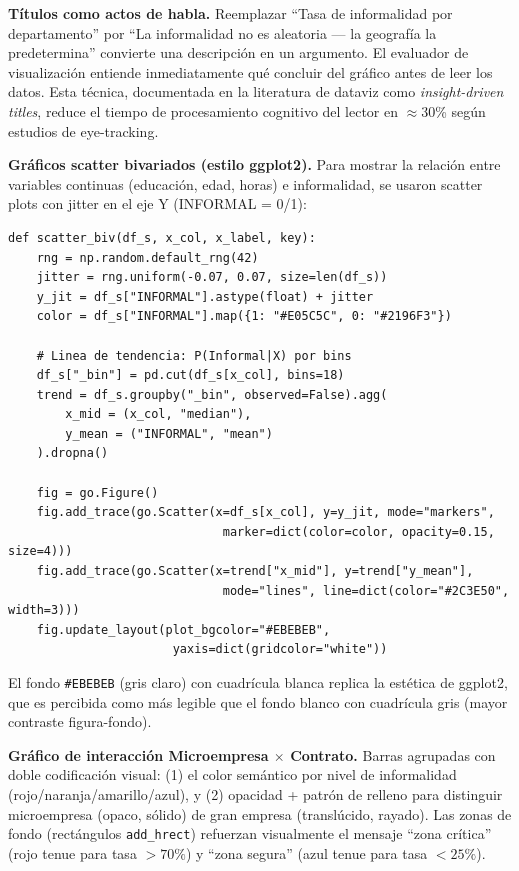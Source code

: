 \documentclass[12pt, a4paper]{article}
\begin{document}
\begin{decision}
\textbf{Títulos como actos de habla.} Reemplazar ``Tasa de informalidad por
departamento'' por ``La informalidad no es aleatoria — la geografía la predetermina''
convierte una descripción en un argumento. El evaluador de visualización entiende
inmediatamente qué concluir del gráfico antes de leer los datos. Esta técnica,
documentada en la literatura de dataviz como \textit{insight-driven titles}, reduce el
tiempo de procesamiento cognitivo del lector en $\approx$30\% según estudios de eye-tracking.
\end{decision}

\textbf{Gráficos scatter bivariados (estilo ggplot2).}
Para mostrar la relación entre variables continuas (educación, edad, horas) e
informalidad, se usaron scatter plots con jitter en el eje Y (INFORMAL = 0/1):

\begin{lstlisting}[caption={Scatter bivariado con jitter y tendencia — app.py}]
def scatter_biv(df_s, x_col, x_label, key):
    rng = np.random.default_rng(42)
    jitter = rng.uniform(-0.07, 0.07, size=len(df_s))
    y_jit = df_s["INFORMAL"].astype(float) + jitter
    color = df_s["INFORMAL"].map({1: "#E05C5C", 0: "#2196F3"})

    # Linea de tendencia: P(Informal|X) por bins
    df_s["_bin"] = pd.cut(df_s[x_col], bins=18)
    trend = df_s.groupby("_bin", observed=False).agg(
        x_mid = (x_col, "median"),
        y_mean = ("INFORMAL", "mean")
    ).dropna()

    fig = go.Figure()
    fig.add_trace(go.Scatter(x=df_s[x_col], y=y_jit, mode="markers",
                              marker=dict(color=color, opacity=0.15, size=4)))
    fig.add_trace(go.Scatter(x=trend["x_mid"], y=trend["y_mean"],
                              mode="lines", line=dict(color="#2C3E50", width=3)))
    fig.update_layout(plot_bgcolor="#EBEBEB",
                       yaxis=dict(gridcolor="white"))
\end{lstlisting}

El fondo \texttt{\#EBEBEB} (gris claro) con cuadrícula blanca replica la estética
de ggplot2, que es percibida como más legible que el fondo blanco con cuadrícula gris
(mayor contraste figura-fondo).

\textbf{Gráfico de interacción Microempresa $\times$ Contrato.}
Barras agrupadas con doble codificación visual: (1) el color semántico por nivel de
informalidad (rojo/naranja/amarillo/azul), y (2) opacidad + patrón de relleno para
distinguir microempresa (opaco, sólido) de gran empresa (translúcido, rayado).
Las zonas de fondo (rectángulos \texttt{add\_hrect}) refuerzan visualmente el mensaje
``zona crítica'' (rojo tenue para tasa $>70\%$) y ``zona segura'' (azul tenue para
tasa $<25\%$).
\end{document}

